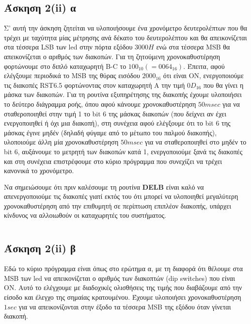 \documentclass[a4paper,10pt]{article} \usepackage{anysize}
\begin{document}
\subsection*{Άσκηση 2(ii) α}
Σ' αυτή την άσκηση ζητείται να υλοποιήσουμε ένα χρονόμετρο δευτερολέπτων
που θα τρέχει με ταχύτητα μίας μέτρησης ανά δέκατο του δευτερολέπτου και θα
απεικονίζεται στα τέσσερα LSB των led στην πόρτα εξόδου $3000H$ ενώ στα τέσσερα
MSB θα απεικονίζεται ο αριθμός των διακοπών. Για τη ζητούμενη χρονοκαθυστέρηση
φορτώνουμε στο διπλό  καταχωρητή B-C το $100_{10} (=0064_{16})$. Έπειτα, αφού
ελέγξουμε περιοδικά το MSB της θύρας εισόδου $2000_{16}$  ότι είναι ΟΝ,
ενεργοποιούμε τις διακοπές RST6.5 φορτώνοντας στον καταχωρητή Α την τιμή
$0D_{16}$
που θα γίνει η μάσκα των διακοπών. Για τη ρουτίνα εξυπηρέτησης της διακοπής
έχουμε υλοποιήσει το δεύτερο διάγραμμα ροής, όπου αφού κάνουμε
χρονοκαθυστέρηση $50 msec$ για να σταθεροποιηθεί στην τιμή 1 το bit 6 της μάσκας
διακοπών (που δείχνει αν έχει ενεργοποιηθεί ή όχι μια διακοπή), στη συνέχεια
αφού ελέγξουμε ότι το bit 6 της μάσκας έγινε μηδέν (δηλαδή φύγαμε από το
μέτωπο του παλμού διακοπής), υλοποιούμε άλλη μία χρονοκαθυστέρηση $50 msec$ για
να σταθεροποιηθεί στο μηδέν το bit 6, αυξάνουμε το μετρητή των διακοπών κατά
1, ενεργοποιούμε ξανά τις διακοπές και στη συνέχεια επιστρέφουμε στο κύριο
πρόγραμμα που συνεχίζει να τρέχει κανονικά το χρονόμετρο.

Να σημειώσουμε ότι πριν καλέσουμε τη ρουτίνα \textbf{DELB} είναι καλό να
απενεργοποιούμε τις διακοπές γιατί εκτός του ότι μπορεί να υλοποιηθεί
μεγαλύτερη χρονοκαθυστέρηση από την επιθυμητή σε περίπτωση επιπλέον διακοπής,
υπάρχει κίνδυνος να αλλοιωθούν οι καταχωρητές του συστήματος.
\inputminted[linenos,obeytabs,fontsize=\footnotesize]{oldasm}{../askhsh_2_ii_a.8085}
\subsection*{Άσκηση 2(ii) β}
Εδώ το κύριο πρόγραμμα είναι όπως στο ερώτημα α, με τη διαφορά ότι θέλουμε στα
MSB των led να απεικονίζεται ο αριθμός των διακοπτών (dip switches) που είναι
ON. Αυτό το ελέγχουμε με διαδοχικές ολισθήσεις της τιμής που διαβάζουμε από
την είσοδο και έλεγχο της σημαίας κρατουμένου. Έχουμε υλοποιήσει
χρονοκαθυστέρηση $1sec$ για να απεικονίζονται στην έξοδο τα τέσσερα MSB της
εξόδου όταν γίνεται διακοπή. 
\inputminted[linenos,obeytabs,fontsize=\footnotesize]{oldasm}{../askhsh_2_ii_b.8085}
\end{document}
